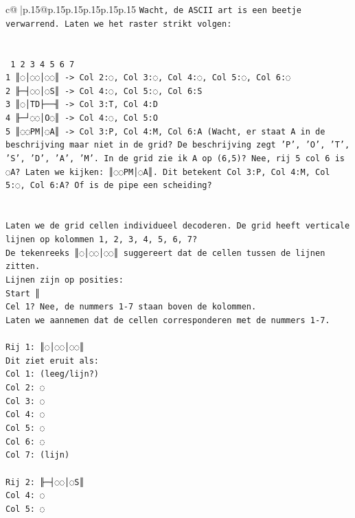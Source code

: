 \documentclass{article}
\begin{document}
{\begin{supertabular}{c@{$\;$}|p{.15\linewidth}@{}p{.15\linewidth}p{.15\linewidth}p{.15\linewidth}p{.15\linewidth}p{.15\linewidth}}
{{{\texttt{Wacht, de ASCII art is een beetje verwarrend. Laten we het raster strikt volgen:} \\
\\ 
\\ 
\texttt{  1 2 3 4 5 6 7} \\
\texttt{1 ║◌│◌◌│◌◌║  {-}> Col 2:◌, Col 3:◌, Col 4:◌, Col 5:◌, Col 6:◌} \\
\texttt{2 ╟─┤◌◌│◌S║  {-}> Col 4:◌, Col 5:◌, Col 6:S} \\
\texttt{3 ║◌│TD├──╢  {-}> Col 3:T, Col 4:D} \\
\texttt{4 ╟─┘◌◌│O◌║  {-}> Col 4:◌, Col 5:O} \\
\texttt{5 ║◌◌PM│◌A║  {-}> Col 3:P, Col 4:M, Col 6:A (Wacht, er staat A in de beschrijving maar niet in de grid? De beschrijving zegt 'P', 'O', 'T', 'S', 'D', 'A', 'M'. In de grid zie ik A op (6,5)? Nee, rij 5 col 6 is ◌A? Laten we kijken: ║◌◌PM│◌A║. Dit betekent Col 3:P, Col 4:M, Col 5:◌, Col 6:A? Of is de pipe een scheiding?} \\
\\ 
\\ 
\texttt{Laten we de grid cellen individueel decoderen. De grid heeft verticale lijnen op kolommen 1, 2, 3, 4, 5, 6, 7?} \\
\texttt{De tekenreeks ║◌│◌◌│◌◌║ suggereert dat de cellen tussen de lijnen zitten.} \\
\texttt{Lijnen zijn op posities:} \\
\texttt{Start ║} \\
\texttt{Cel 1? Nee, de nummers 1{-}7 staan boven de kolommen.} \\
\texttt{Laten we aannemen dat de cellen corresponderen met de nummers 1{-}7.} \\
\\ 
\texttt{Rij 1: ║◌│◌◌│◌◌║} \\
\texttt{Dit ziet eruit als:} \\
\texttt{Col 1: (leeg/lijn?)} \\
\texttt{Col 2: ◌} \\
\texttt{Col 3: ◌} \\
\texttt{Col 4: ◌} \\
\texttt{Col 5: ◌} \\
\texttt{Col 6: ◌} \\
\texttt{Col 7: (lijn)} \\
\\ 
\texttt{Rij 2: ╟─┤◌◌│◌S║} \\
\texttt{Col 4: ◌} \\
\texttt{Col 5: ◌} \\
}}}
\end{supertabular}}
\end{document}
